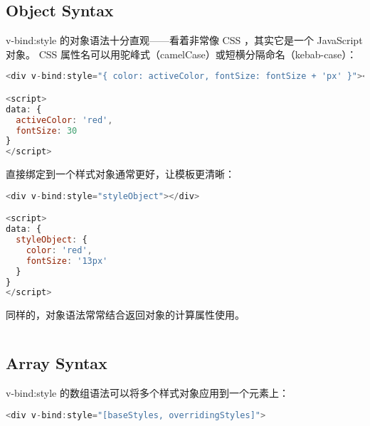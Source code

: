\subsection{Object Syntax}

v-bind:style 的对象语法十分直观——看着非常像 CSS ，其实它是一个 JavaScript 对象。 CSS 属性名可以用驼峰式（camelCase）或短横分隔命名（kebab-case）：


\begin{lstlisting}[language=JavaScript]
<div v-bind:style="{ color: activeColor, fontSize: fontSize + 'px' }"></div>

<script>
data: {
  activeColor: 'red',
  fontSize: 30
}
</script>
\end{lstlisting}

直接绑定到一个样式对象通常更好，让模板更清晰：


\begin{lstlisting}[language=JavaScript]
<div v-bind:style="styleObject"></div>

<script>
data: {
  styleObject: {
    color: 'red',
    fontSize: '13px'
  }
}
</script>
\end{lstlisting}

同样的，对象语法常常结合返回对象的计算属性使用。

\begin{lstlisting}[language=JavaScript]

\end{lstlisting}



\subsection{Array Syntax}

v-bind:style 的数组语法可以将多个样式对象应用到一个元素上：


\begin{lstlisting}[language=JavaScript]
<div v-bind:style="[baseStyles, overridingStyles]">
\end{lstlisting}



\begin{lstlisting}[language=JavaScript]

\end{lstlisting}



\begin{lstlisting}[language=JavaScript]

\end{lstlisting}


